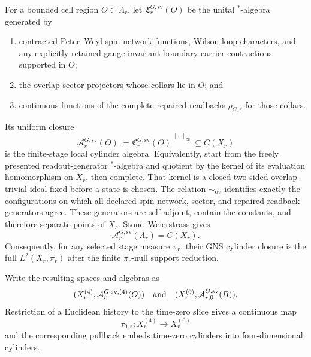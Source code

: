 \begin{definition}
For a bounded cell region \(O\subset\Lambda_r\), let
\(\mathfrak C_r^{G,\mathrm{sv}}(O)\) be the unital \(^*\)-algebra generated by
\begin{enumerate}[label=\textup{(\alph*)},leftmargin=2em]
\item contracted Peter--Weyl spin-network functions, Wilson-loop characters, and any explicitly
retained gauge-invariant boundary-carrier contractions supported in \(O\);
\item the overlap-sector projectors whose collars lie in \(O\); and
\item continuous functions of the complete repaired readbacks \(\rho_{C,r}\) for those collars.
\end{enumerate}
Its uniform closure
\[
\mathcal A_r^{G,\mathrm{sv}}(O)
:=\overline{\mathfrak C_r^{G,\mathrm{sv}}(O)}^{\|\cdot\|_\infty}
\subseteq C(X_r)
\]
is the finite-stage local cylinder algebra. Equivalently, start from the freely presented
readout-generator \(^*\)-algebra and quotient by the kernel of its evaluation homomorphism on
\(X_r\), then complete. That kernel is a closed two-sided overlap-trivial ideal fixed before a
state is chosen.
The relation \(\sim_{\mathrm{ov}}\) identifies exactly the configurations on which all declared
spin-network, sector, and repaired-readback generators agree. These generators are self-adjoint,
contain the constants, and therefore separate points of \(X_r\). Stone--Weierstrass gives
\[
\mathcal A_r^{G,\mathrm{sv}}(\Lambda_r)=C(X_r).
\]
Consequently, for any selected stage measure \(\pi_r\), their GNS cylinder closure is the full
\(L^2(X_r,\pi_r)\) after the finite \(\pi_r\)-null support reduction.

Write the resulting spaces and algebras as
\[
(X_r^{(4)},\mathcal A_r^{G,\mathrm{sv},(4)}(O))
\quad\hbox{and}\quad
(X_r^{(0)},\mathcal A_{r,0}^{G,\mathrm{sv}}(B)).
\]
Restriction of a Euclidean history to the time-zero slice gives a continuous map
\[
\tau_{0,r}:X_r^{(4)}\longrightarrow X_r^{(0)}
\]
and the corresponding pullback embeds time-zero cylinders into four-dimensional cylinders.


\end{definition}
